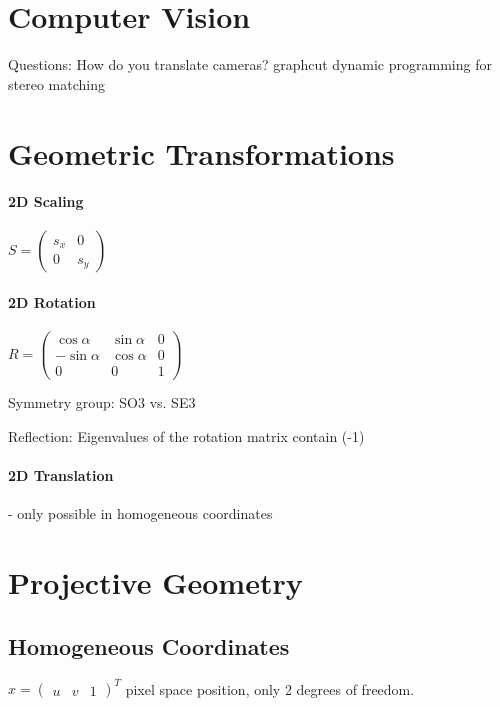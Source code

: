 \section{Computer Vision}

Questions: How do you translate cameras?
graphcut
dynamic programming for stereo matching


\section{Geometric Transformations}

\paragraph{2D Scaling}

$S = \left( \begin{matrix} s_x & 0 \\ 0 & s_y  \end{matrix} \right)$

\paragraph{2D Rotation}

$R = \left(\begin{matrix} \cos  \alpha & \sin \alpha  & 0 \\  -\sin \alpha & \cos \alpha & 0 \\ 0 & 0 & 1  \end{matrix} \right)$

Symmetry group: SO3 vs. SE3

Reflection: Eigenvalues of the rotation matrix contain (-1)

\paragraph{2D Translation} - only possible in homogeneous coordinates

\section{Projective Geometry}

\subsection{Homogeneous Coordinates}

$x = \left(\begin{matrix} u & v & 1 \end{matrix}\right)^T$ pixel space position, only 2 degrees of freedom.

